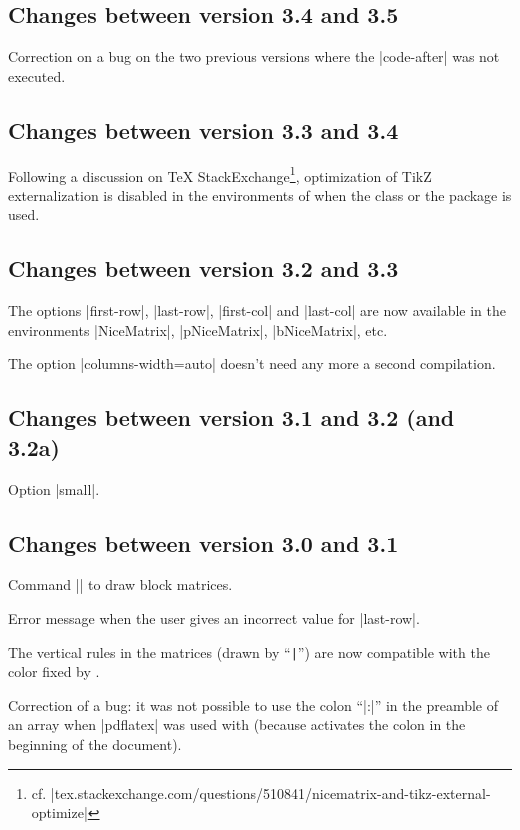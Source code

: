 \documentclass[dvipsnames]{article}%
\begin{document}
\subsection*{Changes between version 3.4 and 3.5} 

Correction on a bug on the two previous versions where the |code-after| was
not executed.

\subsection*{Changes between version 3.3 and 3.4}

Following a discussion on TeX StackExchange\footnote{cf.
|tex.stackexchange.com/questions/510841/nicematrix-and-tikz-external-optimize|}, 
optimization of TikZ externalization is disabled in the environments of
 when the class  or the package
 is used. 

\subsection*{Changes between version 3.2 and 3.3}

The options |first-row|, |last-row|, |first-col| and |last-col| are now
available in the environments |{NiceMatrix}|, |{pNiceMatrix}|,
|{bNiceMatrix}|, etc.

The option |columns-width=auto| doesn't need any more a second compilation.

\subsection*{Changes between version 3.1 and 3.2 (and 3.2a)}

Option |small|.

\subsection*{Changes between version 3.0 and 3.1}

Command |\Block| to draw block matrices.

Error message when the user gives an incorrect value for |last-row|.

The vertical rules in the matrices (drawn by ``\verb+|+'') are now compatible with
the color fixed by .

Correction of a bug: it was not possible to use the colon ``|:|'' in the
preamble of an array when |pdflatex| was used with  (because
 activates the colon in the beginning of the document).
\end{document}
